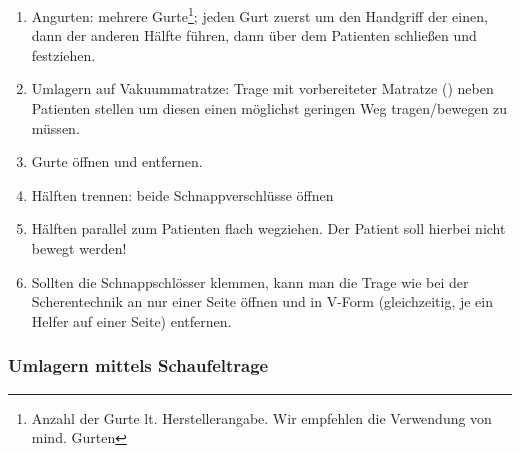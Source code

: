 \documentclass[
ngerman,
paper=a4,
asymmetric,
fontsize=8pt,
draft=false,
numbers=noenddot,
bibtotocnumbered,
footnotes=multiple,
toc=flat,
]{scrbook}
\begin{document}
\begin{ProcedureStepsNoHeading}
{\begin{enumerate}
\begin{itemize}
      Diese Methode ist besonders bei Becken- und
      Oberschenkelverletzungen sinnvoll und der zweiten
      Methode vorzuziehen da der Patient nicht am Becken
      bewegt wird.
      \item 2. Methode: Beide Teile sind getrennt.
      \begin{enumerate}
        \item Der Patient wird leicht an
        Schulter und Hüfte abwechselnd zur Seite gedreht, dabei
        stabilisiert ein 3. Helfer
        den Kopf und folgt der Drehbewegung achsengerecht.
        Die jeweiligen Tragenteile werden während der Drehbewegung
        unter den Patienten geschoben.
        \item Die Hälften werden zuerst am Kopf-, dann am Fußende
        geschlossen.
        \item Abschließend wird eine Kontrolle des sicheren Schlusses durchgeführt.
      \end{enumerate}
    \end{itemize}
    \item Angurten: mehrere Gurte\footnote{Anzahl der Gurte lt.
    Herstellerangabe. Wir empfehlen die Verwendung von mind.  Gurten};
    jeden Gurt zuerst um den Handgriff der einen, dann der anderen Hälfte
    führen,  dann über dem Patienten schließen und festziehen.
    \item Umlagern auf Vakuummatratze: Trage mit
    vorbereiteter Matratze
    () neben
    Patienten stellen um diesen
    einen möglichst geringen Weg tragen/bewegen zu müssen.
    \item Gurte öffnen und entfernen.
    \item Hälften trennen: beide Schnappverschlüsse öffnen
    \item Hälften parallel zum Patienten flach wegziehen. Der Patient soll
    hierbei nicht bewegt werden!
    \item Sollten die Schnappschlösser klemmen, kann man die
    Trage wie bei der Scherentechnik an nur einer Seite
    öffnen und in V-Form (gleichzeitig, je ein Helfer auf
    einer Seite) entfernen.
\end{enumerate}
}{}{}{}{}
\end{ProcedureStepsNoHeading}

\clearpage
\subsubsection{Umlagern mittels Schaufeltrage}
\label{topic:schaufeltrage-umlagern}
\end{document}
